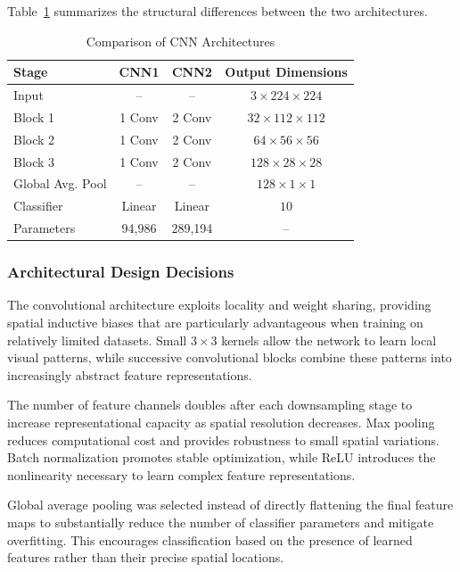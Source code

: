 \documentclass[conference]{IEEEtran}
\begin{document}
Table~\ref{tab:cnn_architecture} summarizes the structural
differences between the two architectures.

\begin{table}[htbp]
    \centering
    \caption{Comparison of CNN Architectures}
    \label{tab:cnn_architecture}
    \begin{tabular}{lccc}
        \toprule
        Stage & CNN1 & CNN2 & Output Dimensions \\
        \midrule
        Input & -- & -- & $3 \times 224 \times 224$ \\
        Block 1 & 1 Conv & 2 Conv & $32 \times 112 \times 112$ \\
        Block 2 & 1 Conv & 2 Conv & $64 \times 56 \times 56$ \\
        Block 3 & 1 Conv & 2 Conv & $128 \times 28 \times 28$ \\
        Global Avg. Pool & -- & -- & $128 \times 1 \times 1$ \\
        Classifier & Linear & Linear & $10$ \\
        \midrule
        Parameters & 94,986 & 289,194 & -- \\
        \bottomrule
    \end{tabular}
\end{table}

\subsubsection{Architectural Design Decisions}

The convolutional architecture exploits locality and
weight sharing, providing spatial inductive biases that
are particularly advantageous when training on relatively
limited datasets. Small $3 \times 3$ kernels allow the
network to learn local visual patterns, while successive
convolutional blocks combine these patterns into
increasingly abstract feature representations.

The number of feature channels doubles after each
downsampling stage to increase representational capacity
as spatial resolution decreases. Max pooling reduces
computational cost and provides robustness to small
spatial variations. Batch normalization promotes stable
optimization, while ReLU introduces the nonlinearity
necessary to learn complex feature representations.

Global average pooling was selected instead of directly
flattening the final feature maps to substantially reduce
the number of classifier parameters and mitigate
overfitting. This encourages classification based on
the presence of learned features rather than their
precise spatial locations.
\end{document}

